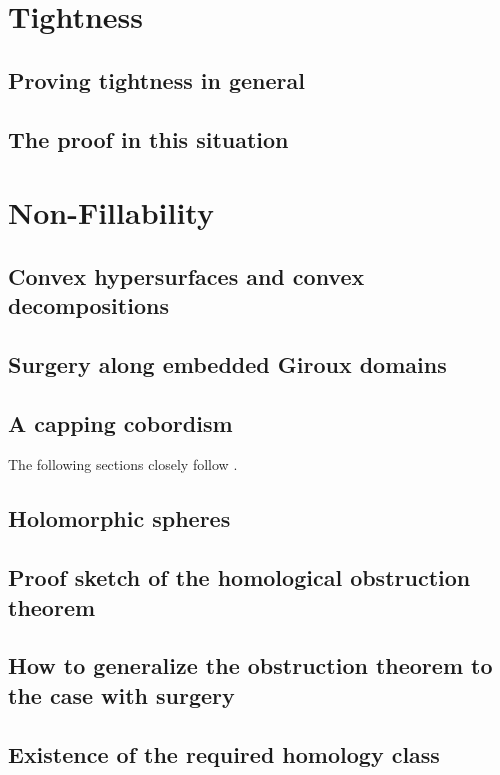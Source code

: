 \documentclass[oneside]{amsbook}
\begin{document}
\chapter{Tightness}

\section{Proving tightness in general}

\section{The proof in this situation}



\chapter{Non-Fillability}
\section{Convex hypersurfaces and convex decompositions}

\section{Surgery along embedded Giroux domains}

\section{A capping cobordism}
The following sections closely follow \cite[Section 6]{BGM22}.

\section{Holomorphic spheres}

\section{Proof sketch of the homological obstruction theorem}

\section{How to generalize the obstruction theorem to the case with surgery}
\section{Existence of the required homology class}


\newpage


\end{document}
